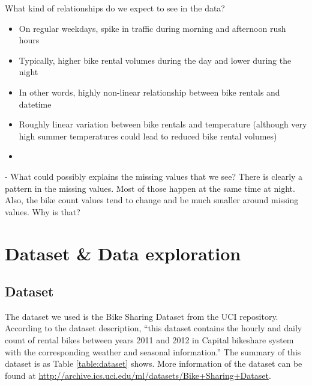 \documentclass[12pt]{article}
\begin{document}
		What kind of relationships do we expect to see in the data?
		\begin{itemize}
			\item On regular weekdays, spike in traffic during morning and afternoon rush hours
			\item Typically, higher bike rental volumes during the day and lower during the night
			\item In other words, highly non-linear relationship between bike rentals and datetime
			\item Roughly linear variation between bike rentals and temperature (although very high summer temperatures could lead to reduced bike rental volumes)
			\item 
		\end{itemize}
		
		
		- What could possibly explains the missing values that we see?
		There is clearly a pattern in the missing values. Most of those happen at the same time at night.
		Also, the bike count values tend to change and be much smaller around missing values. Why is that?
		
	
	\section{Dataset \& Data exploration}
	\subsection{Dataset}
	The dataset we used is the Bike Sharing Dataset from the UCI repository. According to the dataset description, ``this dataset contains the hourly and daily count of rental bikes between years 2011 and 2012 in Capital bikeshare system with the corresponding weather and seasonal information.''
	The summary of this dataset is as Table \ref{table:dataset} shows. More information of the dataset can be found at \url{http://archive.ics.uci.edu/ml/datasets/Bike+Sharing+Dataset}.
	
\end{document}

